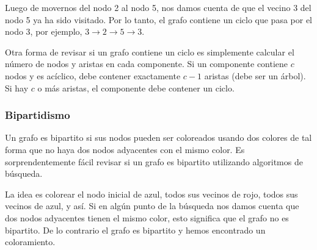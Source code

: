 Luego de movernos del nodo 2 al nodo 5, nos damos cuenta
de que el vecino 3 del nodo 5 ya ha sido visitado. Por
lo tanto, el grafo contiene un ciclo que pasa por el nodo 3,
por ejemplo, $3 \rightarrow 2 \rightarrow 5 \rightarrow 3$.

Otra forma de revisar si un grafo contiene un ciclo es
simplemente calcular el número de nodos y aristas en cada
componente. Si un componente contiene $c$ nodos y es acíclico,
debe contener exactamente $c-1$ aristas (debe ser un árbol).
Si hay $c$ o más aristas, el componente debe contener un ciclo.

\subsubsection{Bipartidismo}


Un grafo es bipartito si sus nodos pueden ser coloreados
usando dos colores de tal forma que no haya dos nodos adyacentes
con el mismo color. Es sorprendentemente fácil revisar si un
grafo es bipartito utilizando algoritmos de búsqueda.

La idea es colorear el nodo inicial de azul, todos sus vecinos
de rojo, todos sus vecinos de azul, y así. Si en algún punto de la
búsqueda nos damos cuenta que dos nodos adyacentes tienen el mismo
color, esto significa que el grafo no es bipartito. De lo contrario
el grafo es bipartito y hemos encontrado un coloramiento.


